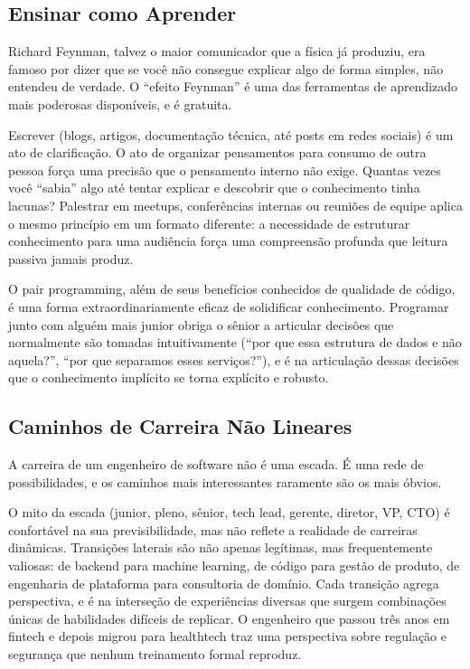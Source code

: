 \subsection{Ensinar como Aprender}

Richard Feynman, talvez o maior comunicador que a física já produziu, era famoso por dizer que se você não consegue explicar algo de forma simples, não entendeu de verdade. O ``efeito Feynman'' é uma das ferramentas de aprendizado mais poderosas disponíveis, e é gratuita.

Escrever (blogs, artigos, documentação técnica, até posts em redes sociais) é um ato de clarificação. O ato de organizar pensamentos para consumo de outra pessoa força uma precisão que o pensamento interno não exige. Quantas vezes você ``sabia'' algo até tentar explicar e descobrir que o conhecimento tinha lacunas? Palestrar em meetups, conferências internas ou reuniões de equipe aplica o mesmo princípio em um formato diferente: a necessidade de estruturar conhecimento para uma audiência força uma compreensão profunda que leitura passiva jamais produz.

O pair programming, além de seus benefícios conhecidos de qualidade de código, é uma forma extraordinariamente eficaz de solidificar conhecimento. Programar junto com alguém mais junior obriga o sênior a articular decisões que normalmente são tomadas intuitivamente (``por que essa estrutura de dados e não aquela?'', ``por que separamos esses serviços?''), e é na articulação dessas decisões que o conhecimento implícito se torna explícito e robusto.

\subsection{Caminhos de Carreira Não Lineares}

A carreira de um engenheiro de software não é uma escada. É uma rede de possibilidades, e os caminhos mais interessantes raramente são os mais óbvios.

O mito da escada (junior, pleno, sênior, tech lead, gerente, diretor, VP, CTO) é confortável na sua previsibilidade, mas não reflete a realidade de carreiras dinâmicas. Transições laterais são não apenas legítimas, mas frequentemente valiosas: de backend para machine learning, de código para gestão de produto, de engenharia de plataforma para consultoria de domínio. Cada transição agrega perspectiva, e é na interseção de experiências diversas que surgem combinações únicas de habilidades difíceis de replicar. O engenheiro que passou três anos em fintech e depois migrou para healthtech traz uma perspectiva sobre regulação e segurança que nenhum treinamento formal reproduz.

